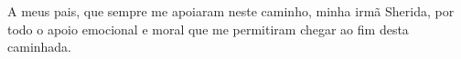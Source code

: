 \maketitle

\begin{itadedication}
A meus pais, que sempre me apoiaram neste caminho, minha irmã Sherida, por todo o apoio emocional e moral que me permitiram chegar ao fim desta caminhada.
\end{itadedication}

%

\thispagestyle{empty}
\ifhyperref{}\fi
\begin{flushright}
\begin{spacing}{1}
\mbox{}\vfill

\end{spacing}
\end{flushright}

\begin{abstract}
\noindent

\end{abstract}

\begin{englishabstract}
\noindent

\end{englishabstract}



\listofabbreviations


